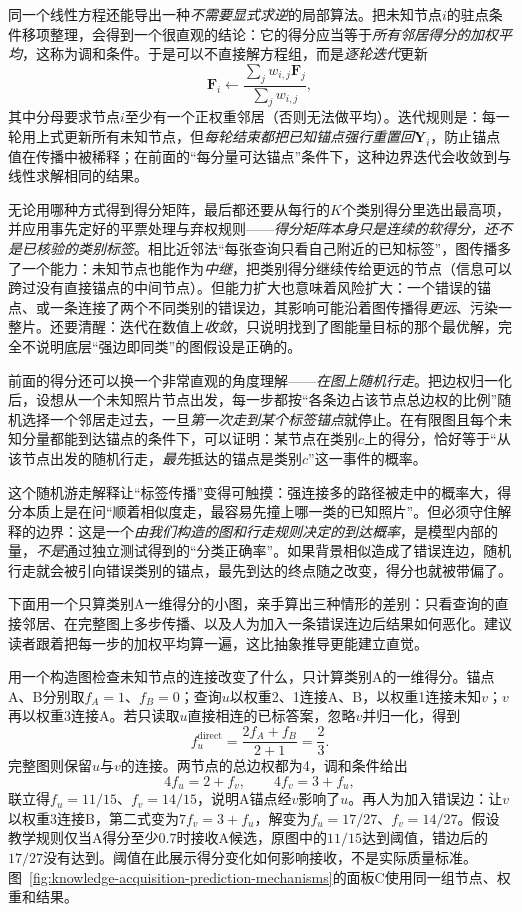 同一个线性方程还能导出一种\emph{不需要显式求逆}的局部算法。把未知节点$i$的驻点条件移项整理，会得到一个很直观的结论：它的得分应当等于\emph{所有邻居得分的加权平均}，这称为调和条件。于是可以不直接解方程组，而是\emph{逐轮迭代}更新
\[
  \bm{F}_i
  \leftarrow
  \frac{\sum_j w_{i,j}\bm{F}_j}{\sum_j w_{i,j}},
\]
其中分母要求节点$i$至少有一个正权重邻居（否则无法做平均）。迭代规则是：每一轮用上式更新所有未知节点，但\emph{每轮结束都把已知锚点强行重置回}$\bm{Y}_i$，防止锚点值在传播中被稀释；在前面的“每分量可达锚点”条件下，这种边界迭代会收敛到与线性求解相同的结果。

无论用哪种方式得到得分矩阵，最后都还要从每行的$K$个类别得分里选出最高项，并应用事先定好的平票处理与弃权规则——\emph{得分矩阵本身只是连续的软得分，还不是已核验的类别标签}。相比近邻法“每张查询只看自己附近的已知标签”，图传播多了一个能力：未知节点也能作为\emph{中继}，把类别得分继续传给更远的节点（信息可以跨过没有直接锚点的中间节点）。但能力扩大也意味着风险扩大：一个错误的锚点、或一条连接了两个不同类别的错误边，其影响可能沿着图传播得\emph{更远}、污染一整片。还要清醒：迭代在数值上\emph{收敛}，只说明找到了图能量目标的那个最优解，完全不说明底层“强边即同类”的图假设是正确的。

前面的得分还可以换一个非常直观的角度理解——\emph{在图上随机行走}。把边权归一化后，设想从一个未知照片节点出发，每一步都按“各条边占该节点总边权的比例”随机选择一个邻居走过去，一旦\emph{第一次走到某个标签锚点}就停止。在有限图且每个未知分量都能到达锚点的条件下，可以证明：某节点在类别$c$上的得分，恰好等于“从该节点出发的随机行走，\emph{最先}抵达的锚点是类别$c$”这一事件的概率。

这个随机游走解释让“标签传播”变得可触摸：强连接多的路径被走中的概率大，得分本质上是在问“顺着相似度走，最容易先撞上哪一类的已知照片”。但必须守住解释的边界：这是一个\emph{由我们构造的图和行走规则决定的到达概率}，是模型内部的量，\emph{不是}通过独立测试得到的“分类正确率”。如果背景相似造成了错误连边，随机行走就会被引向错误类别的锚点，最先到达的终点随之改变，得分也就被带偏了。

下面用一个只算类别A一维得分的小图，亲手算出三种情形的差别：只看查询的直接邻居、在完整图上多步传播、以及人为加入一条错误连边后结果如何恶化。建议读者跟着把每一步的加权平均算一遍，这比抽象推导更能建立直觉。

\begin{example}
  \label{ex:knowledge-acquisition-graph-propagation}
  用一个构造图检查未知节点的连接改变了什么，只计算类别A的一维得分。锚点A、B分别取$f_A=1$、$f_B=0$；查询$u$以权重2、1连接A、B，以权重1连接未知$v$；$v$再以权重3连接A。若只读取$u$直接相连的已标答案，忽略$v$并归一化，得到
  \[
    f_u^{\mathrm{direct}}=\frac{2f_A+f_B}{2+1}=\frac{2}{3}.
  \]
  完整图则保留$u$与$v$的连接。两节点的总边权都为4，调和条件给出
  \[
    4f_u=2+f_v,\qquad 4f_v=3+f_u,
  \]
  联立得$f_u=11/15$、$f_v=14/15$，说明A锚点经$v$影响了$u$。再人为加入错误边：让$v$以权重3连接B，第二式变为$7f_v=3+f_u$，解变为$f_u=17/27$、$f_v=14/27$。假设教学规则仅当A得分至少$0.7$时接收A候选，原图中的$11/15$达到阈值，错边后的$17/27$没有达到。阈值在此展示得分变化如何影响接收，不是实际质量标准。图~\ref{fig:knowledge-acquisition-prediction-mechanisms}的面板C使用同一组节点、权重和结果。
\end{example}

